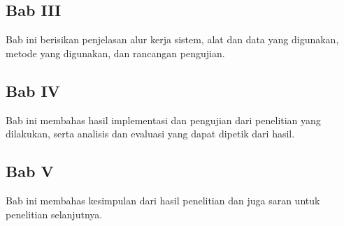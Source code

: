 \subsection*{Bab III}
Bab ini berisikan penjelasan alur kerja sistem, alat dan data yang digunakan, metode yang digunakan, dan rancangan pengujian.

\subsection*{Bab IV}
Bab ini membahas hasil implementasi dan pengujian dari penelitian yang dilakukan, serta analisis dan evaluasi yang dapat dipetik dari hasil.

\subsection*{Bab V}
Bab ini membahas kesimpulan dari hasil penelitian dan juga saran untuk penelitian selanjutnya.
